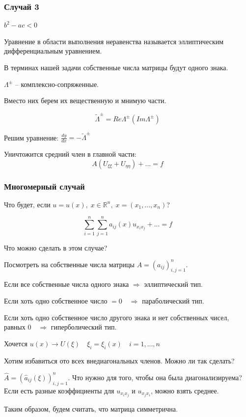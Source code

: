 \documentclass[12pt]{report}
\begin{document}
\subsubsection{Случай 3}
$b ^ 2 - ac < 0$

Уравнение в области выполнения неравенства называется эллиптическим дифференциальным уравнением. 

В терминах нашей задачи собственные числа матрицы будут одного знака. 

$\Lambda^{\pm}$ -- комплексно-сопряженные. 

Вместо них берем их вещественную и мнимую части. 

$$\tilde{\Lambda}^{\pm} = Re \Lambda^{\pm} (Im \Lambda^{\pm})$$

Решим уравнение: $\frac{dy}{dx} = - \tilde{\Lambda}^{\pm}$

Уничтожится средний член в главной части: 
$$A(U_{\xi \xi} + U_{\eta \eta}) + ... = f$$

\subsubsection{Многомерный случай}

Что будет, если $u=u(x), \; x \in \mathbb{R} ^ n, \; x = (x_1, ..., x_n)$? 

$$\sum^{n}_{i=1}\sum^{n}_{j=1}{a_{ij}(x) u_{x_i x_j}} + ... = f$$

Что можно сделать в этом случае? 

Посмотреть на собственные числа матрицы $A = (a_{i j})^{n}_{i,j = 1}$. 

Если все собственные числа одного знака $\Longrightarrow$ эллиптический тип.

Если хоть одно собственное число $=0 \quad \Longrightarrow$ параболический тип. 

Если хоть одно собственное число другого знака и нет собственных чисел, равных $0 \quad \Longrightarrow$ гиперболический тип.

Хочется $u(x) \longrightarrow U(\xi) \quad \xi_i = \xi_i(x) \quad i=1,...,n$

Хотим избавиться ото всех внедиагональных членов. Можно ли так сделать? 

$\hat{A} = (\hat{a}_{i j}(\xi))^{n}_{i,j = 1}$. Что нужно для того, чтобы она была диагонализируема? Если есть разные коэффициенты для $u_{x_i x_j}$ и $u_{x_j x_i}$, можно взять среднее. 

Таким образом, будем считать, что матрица симметрична. 
\end{document}

